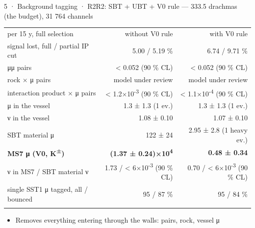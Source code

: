 \begin{btframe}{5 · Background tagging · R2}{R2: SBT + UBT + V0 rule — 333.5 drachmas (the budget), 31 764 channels}
{\centering {}\par}
\vspace{2.46pt}
\noindent \begin{minipage}[c]{0.5\linewidth}
{\fontsize{5.31pt}{6.90pt}\selectfont\setlength{\tabcolsep}{3.72pt}\renewcommand{\arraystretch}{1.42}
\begin{tabular}{lrr}
\textcolor{muted}{per 15 y, full selection} & \textcolor{muted}{without V0 rule} & \textcolor{muted}{with V0 rule} \\\headrule
signal lost, full / partial IP cut & 5.00 / 5.19 \% & 6.74 / 9.71 \% \\\rowrule
μμ pairs & < 0.052 (90 \% CL) & < 0.052 (90 \% CL) \\\rowrule
rock × μ pairs & \textcolor{muted}{model under review} & \textcolor{muted}{model under review} \\\rowrule
interaction product × μ pairs & < 1.2×10\textsuperscript{-3} (90 \% CL) & < 1.1×10\textsuperscript{-4} (90 \% CL) \\\rowrule
μ in the vessel & 1.3 ± 1.3 (1 ev.) & 1.3 ± 1.3 (1 ev.) \\\rowrule
ν in the vessel & 1.08 ± 0.10 & 1.07 ± 0.10 \\\rowrule
SBT material μ & 122 ± 24 & 2.95 ± 2.8 (1 heavy ev.) \\\rowrule
\rowcolor{tint}\bfseries MS7 μ (V0, K\textsuperscript{±}) & \bfseries (1.37 ± 0.24)×10\textsuperscript{4} & \bfseries 0.48 ± 0.34 \\\rowrule
ν in MS7 / SBT material ν & 1.73 / < 6×10\textsuperscript{-3} (90 \% CL) & 0.70 / < 6×10\textsuperscript{-3} (90 \% CL) \\\rowrule
single SST1 μ tagged, all / bounced & 95 / 87 \% & 95 / 84 \% \\\rowrule
\end{tabular}\par}
\end{minipage}%
\hfill%
\begin{minipage}[c]{0.5\linewidth}
{\fontsize{6.15pt}{8.60pt}\selectfont
\begin{itemize}
  \item Removes everything entering through the walls: pairs, rock, vessel μ

\end{itemize}}
\end{minipage}
\end{btframe}
